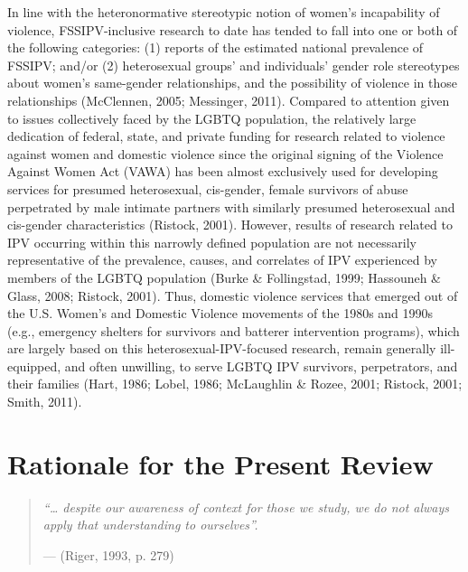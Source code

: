 \documentclass[11pt,]{tufte-book}
\begin{document}
In line with the heteronormative stereotypic notion of women's
incapability of violence, FSSIPV-inclusive research to date has tended
to fall into one or both of the following categories: (1) reports of the
estimated national prevalence of FSSIPV; and/or (2) heterosexual groups'
and individuals' gender role stereotypes about women's same-gender
relationships, and the possibility of violence in those relationships
(McClennen, 2005; Messinger, 2011). Compared to attention given to
issues collectively faced by the LGBTQ population, the relatively large
dedication of federal, state, and private funding for research related
to violence against women and domestic violence since the original
signing of the Violence Against Women Act (VAWA) has been almost
exclusively used for developing services for presumed heterosexual,
cis-gender, female survivors of abuse perpetrated by male intimate
partners with similarly presumed heterosexual and cis-gender
characteristics (Ristock, 2001). However, results of research related to
IPV occurring within this narrowly defined population are not
necessarily representative of the prevalence, causes, and correlates of
IPV experienced by members of the LGBTQ population (Burke \&
Follingstad, 1999; Hassouneh \& Glass, 2008; Ristock, 2001). Thus,
domestic violence services that emerged out of the U.S. Women's and
Domestic Violence movements of the 1980s and 1990s (e.g., emergency
shelters for survivors and batterer intervention programs), which are
largely based on this heterosexual-IPV-focused research, remain
generally ill-equipped, and often unwilling, to serve LGBTQ IPV
survivors, perpetrators, and their families (Hart, 1986; Lobel, 1986;
McLaughlin \& Rozee, 2001; Ristock, 2001; Smith, 2011).

\chapter{Rationale for the Present
Review}\label{rationale-for-the-present-review}

\begin{quote}
\emph{``\ldots{} despite our awareness of context for those we study, we
do not always apply that understanding to ourselves''.}

\hfill --- (Riger, 1993, p. 279)
\end{quote}
\end{document}
